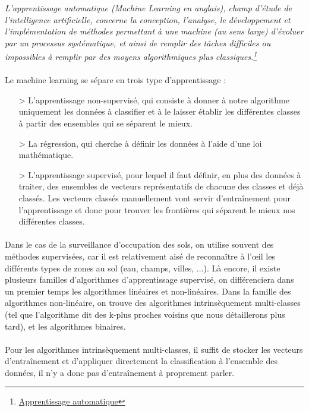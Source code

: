 \textit{L'apprentissage automatique (Machine Learning en anglais), champ d'étude de l'intelligence artificielle, concerne la conception, l'analyse, le développement et l'implémentation de méthodes permettant à une machine (au sens large) d'évoluer par un processus systématique, et ainsi de remplir des tâches difficiles ou impossibles à remplir par des moyens algorithmiques plus classiques.\footnote{\href{https://fr.wikipedia.org/wiki/Apprentissage_automatique}{Apprentissage automatique}}}

\paragraph{}
Le machine learning se sépare en trois type d'apprentissage :
\begin{itemize}
  \item[>] L'apprentissage non-supervisé, qui consiste à donner à notre algorithme uniquement les données à classifier et à le laisser établir les différentes classes à partir des ensembles qui se séparent le mieux.
  \item[>] La régression, qui cherche à définir les données à l'aide d'une loi mathématique.
  \item[>] L'apprentissage supervisé, pour lequel il faut définir, en plus des données à traiter, des ensembles de vecteurs représentatifs de chacune des classes et déjà classés. Les vecteurs classés manuellement vont servir d’entraînement pour l'apprentissage et donc pour trouver les frontières qui séparent le mieux nos différentes classes.
\end{itemize}

\paragraph{}
Dans le cas de la surveillance d'occupation des sols, on utilise souvent des méthodes supervisées, car il est relativement aisé de reconnaître à l'œil les différents types de zones au sol (eau, champs, villes, ...). Là encore, il existe plusieurs familles d'algorithmes d'apprentissage supervisé, on différenciera dans un premier temps les algorithmes linéaires et non-linéaires. Dans la famille des algorithmes non-linéaire, on trouve des algorithmes intrinsèquement multi-classes (tel que l'algorithme dit des k-plus proches voisins que nous détaillerons plus tard), et les algorithmes binaires.
\paragraph{}
Pour les algorithmes intrinsèquement multi-classes, il suffit de stocker les vecteurs d’entraînement et d'appliquer directement la classification à l'ensemble des données, il n'y a donc pas d’entraînement à proprement parler.
